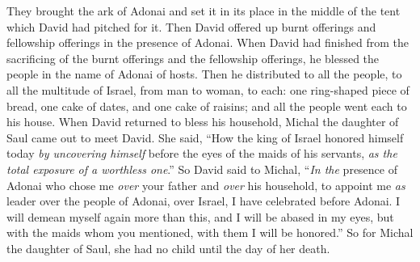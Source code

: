 \begin{biblechapter}
\verse They brought the ark of Adonai and set it in its place in the middle of the tent which David had pitched for it. Then David offered up burnt offerings and fellowship offerings in the presence of Adonai.
\verse When David had finished from the sacrificing of the burnt offerings and the fellowship offerings, he blessed the people in the name of Adonai of hosts.
\verse Then he distributed to all the people, to all the multitude of Israel, from man to woman, to each: one ring-shaped piece of bread, one cake of dates, and one cake of raisins; and all the people went each to his house.
\verse When David returned to bless his household, Michal the daughter of Saul came out to meet David. She said, “How the king of Israel honored himself today \textit{by uncovering himself} before the eyes of the maids of his servants, \textit{as the total exposure of a worthless one}.”
\verse So David said to Michal, “\textit{In the} presence of Adonai who chose me \textit{over} your father and \textit{over} his household, to appoint me \textit{as} leader over the people of Adonai, over Israel, I have celebrated before Adonai.
\verse I will demean myself again more than this, and I will be abased in my eyes, but with the maids whom you mentioned, with them I will be honored.”
\verse So for Michal the daughter of Saul, she had no child until the day of her death.
\end{biblechapter}

